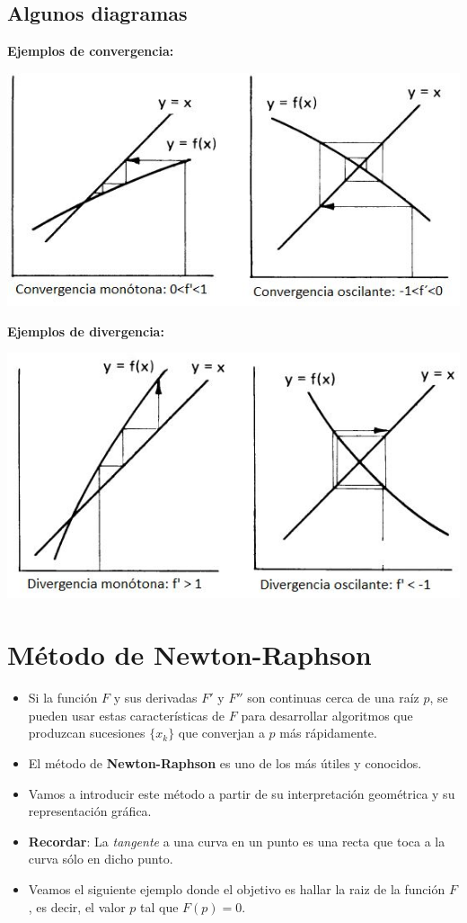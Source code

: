 \documentclass[]{book}
\providecommand{\tightlist}{%
  \setlength{\itemsep}{0pt}\setlength{\parskip}{0pt}}
\begin{document}
\hypertarget{algunos-diagramas}{%
\subsection{Algunos diagramas}\label{algunos-diagramas}}

\textbf{Ejemplos de convergencia:}

\begin{center}\includegraphics[width=0.75\linewidth]{Plots/U2/convergencia} \end{center}

\textbf{Ejemplos de divergencia:}

\begin{center}\includegraphics[width=0.75\linewidth]{Plots/U2/divergencia} \end{center}

\hypertarget{muxe9todo-de-newton-raphson}{%
\section{Método de Newton-Raphson}\label{muxe9todo-de-newton-raphson}}

\begin{itemize}
\tightlist
\item
  Si la función \(F\) y sus derivadas \(F'\) y \(F''\) son continuas cerca de una raíz \(p\), se pueden usar estas características de \(F\) para desarrollar algoritmos que produzcan sucesiones \(\{x_k\}\) que converjan a \(p\) más rápidamente.
\item
  El método de \textbf{Newton-Raphson} es uno de los más útiles y conocidos.
\item
  Vamos a introducir este método a partir de su interpretación geométrica y su representación gráfica.
\item
  \textbf{Recordar}: La \emph{tangente} a una curva en un punto es una recta que toca a la curva sólo en dicho punto.
\item
  Veamos el siguiente ejemplo donde el objetivo es hallar la raiz de la función \(F\), es decir, el valor \(p\) tal que \(F(p) = 0\).
\end{itemize}
\end{document}
